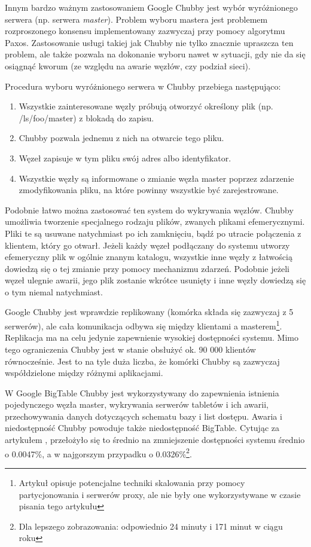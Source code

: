 Innym bardzo ważnym zastosowaniem Google Chubby jest wybór wyróżnionego serwera (np. serwera \emph{master}).
Problem wyboru mastera jest problemem rozproszonego konsensu implementowany zazwyczaj przy pomocy algorytmu Paxos.
Zastosowanie usługi takiej jak Chubby nie tylko znacznie upraszcza ten problem, ale także pozwala na dokonanie wyboru nawet w sytuacji, gdy nie da się osiągnąć kworum (ze względu na awarie węzłów, czy podział sieci).

Procedura wyboru wyróżnionego serwera w Chubby przebiega następująco:

\begin{enumerate}
 \item Wszystkie zainteresowane węzły próbują otworzyć określony plik (np. /ls/foo/master) z blokadą do zapisu.
 \item Chubby pozwala jednemu z nich na otwarcie tego pliku.
 \item Węzeł zapisuje w tym pliku swój adres albo identyfikator.
 \item Wszystkie węzły są informowane o zmianie węzła master poprzez zdarzenie zmodyfikowania pliku, na które powinny wszystkie być zarejestrowane.
\end{enumerate}

Podobnie łatwo można zastosować ten system do wykrywania węzłów.
Chubby umożliwia tworzenie specjalnego rodzaju plików, zwanych plikami efemerycznymi.
Pliki te są usuwane natychmiast po ich zamknięciu, bądź po utracie połączenia z klientem, który go otwarł.
Jeżeli każdy węzeł podłączany do systemu utworzy efemeryczny plik w ogólnie znanym katalogu, wszystkie inne węzły z łatwością dowiedzą się o tej zmianie przy pomocy mechanizmu zdarzeń.
Podobnie jeżeli węzeł ulegnie awarii, jego plik zostanie wkrótce usunięty i inne węzły dowiedzą się o tym niemal natychmiast.

Google Chubby jest wprawdzie replikowany (komórka składa się zazwyczaj z 5 serwerów), ale cała komunikacja odbywa się między klientami a masterem\footnote{Artykuł \cite{google-chubby} opisuje potencjalne techniki skalowania przy pomocy partycjonowania i serwerów proxy, ale nie były one wykorzystywane w czasie pisania tego artykułu}.
Replikacja ma na celu jedynie zapewnienie wysokiej dostępności systemu.
Mimo tego ograniczenia Chubby jest w stanie obsłużyć ok. 90 000 klientów równocześnie.
Jest to na tyle duża liczba, że komórki Chubby są zazwyczaj współdzielone między różnymi aplikacjami.

W Google BigTable Chubby jest wykorzystywany do zapewnienia istnienia pojedynczego węzła master, wykrywania serwerów tabletów i ich awarii, przechowywania danych dotyczących schematu bazy i list dostępu.
Awaria i niedostępność Chubby powoduje także niedostępność BigTable.
Cytując za artykułem \cite{google-bigtable}, przełożyło się to średnio na zmniejszenie dostępności systemu średnio o 0.0047\%, a w najgorszym przypadku o 0.0326\%\footnote{Dla lepszego zobrazowania: odpowiednio 24 minuty i 171 minut w ciągu roku}.

